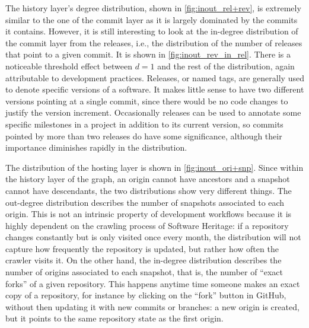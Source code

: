 The history layer's degree distribution, shown in \cref{fig:inout_rel+rev},
is extremely similar to the one of the commit layer as it is largely dominated
by the commits it contains. However, it is still interesting
to look at the in-degree distribution of the commit layer from the releases,
i.e., the distribution of the number of releases that point to a given commit.
It is shown in \cref{fig:inout_rev_in_rel}.  There is a noticeable threshold
effect between $d = 1$ and the rest of the distribution, again attributable to
development practices. Releases, or named tags, are generally used to denote
specific versions of a software. It makes little sense to have two different
versions pointing at a single commit, since there would be no code changes to
justify the version increment. Occasionally releases can be used to annotate
some specific milestones in a project in addition to its current version, so
commits pointed by more than two releases do have some significance, although
their importance diminishes rapidly in the distribution.


The distribution of the hosting layer is shown in \cref{fig:inout_ori+snp}.
Since within the history layer of the graph, an origin cannot have ancestors
and a snapshot cannot have descendants, the two distributions show very
different things.
The out-degree distribution describes the number of snapshots associated to
each origin. This is not an intrinsic property of development workflows
because it is highly dependent on the crawling process of Software Heritage: if
a repository changes constantly but is only visited once every month, the
distribution will not capture how frequently the repository is updated, but
rather how often the crawler visits it.
On the other hand, the in-degree distribution describes the number of origins
associated to each snapshot, that is, the number of ``exact forks'' of a given
repository. This happens anytime time someone makes an exact copy of a
repository, for instance by clicking on the ``fork'' button in GitHub, without
then updating it with new commits or branches: a new origin is created, but it
points to the same repository state as the first origin.


% 

